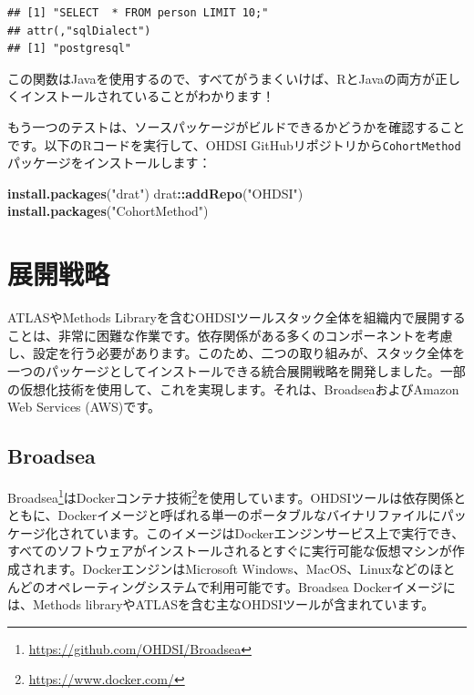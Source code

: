 \documentclass[
  11pt]{book}
\newenvironment{Shaded}{\begin{snugshade}}{\end{snugshade}}
\newcommand{\FunctionTok}[1]{\textcolor[rgb]{0.13,0.29,0.53}{\textbf{#1}}}
\newcommand{\NormalTok}[1]{#1}
\newcommand{\SpecialCharTok}[1]{\textcolor[rgb]{0.81,0.36,0.00}{\textbf{#1}}}
\newcommand{\StringTok}[1]{\textcolor[rgb]{0.31,0.60,0.02}{#1}}
\theoremstyle{definition}
\theoremstyle{definition}
\theoremstyle{definition}
\theoremstyle{definition}
\theoremstyle{remark}
\begin{document}
\begin{verbatim}
## [1] "SELECT  * FROM person LIMIT 10;"
## attr(,"sqlDialect")
## [1] "postgresql"
\end{verbatim}

この関数はJavaを使用するので、すべてがうまくいけば、RとJavaの両方が正しくインストールされていることがわかります！

もう一つのテストは、ソースパッケージがビルドできるかどうかを確認することです。以下のRコードを実行して、OHDSI GitHubリポジトリから\texttt{CohortMethod}パッケージをインストールします：

\begin{Shaded}
\begin{Highlighting}[]
\FunctionTok{install.packages}\NormalTok{(}\StringTok{"drat"}\NormalTok{)}
\NormalTok{drat}\SpecialCharTok{::}\FunctionTok{addRepo}\NormalTok{(}\StringTok{"OHDSI"}\NormalTok{)}
\FunctionTok{install.packages}\NormalTok{(}\StringTok{"CohortMethod"}\NormalTok{)}
\end{Highlighting}
\end{Shaded}

\section{展開戦略}\label{ux5c55ux958bux6226ux7565}

ATLASやMethods Libraryを含むOHDSIツールスタック全体を組織内で展開することは、非常に困難な作業です。依存関係がある多くのコンポーネントを考慮し、設定を行う必要があります。このため、二つの取り組みが、スタック全体を一つのパッケージとしてインストールできる統合展開戦略を開発しました。一部の仮想化技術を使用して、これを実現します。それは、BroadseaおよびAmazon Web Services (AWS)です。 

\subsection{Broadsea}\label{broadsea}

Broadsea\footnote{\url{https://github.com/OHDSI/Broadsea}}はDockerコンテナ技術\footnote{\url{https://www.docker.com/}}を使用しています。OHDSIツールは依存関係とともに、Dockerイメージと呼ばれる単一のポータブルなバイナリファイルにパッケージ化されています。このイメージはDockerエンジンサービス上で実行でき、すべてのソフトウェアがインストールされるとすぐに実行可能な仮想マシンが作成されます。DockerエンジンはMicrosoft Windows、MacOS、Linuxなどのほとんどのオペレーティングシステムで利用可能です。Broadsea Dockerイメージには、Methods libraryやATLASを含む主なOHDSIツールが含まれています。 
\end{document}
